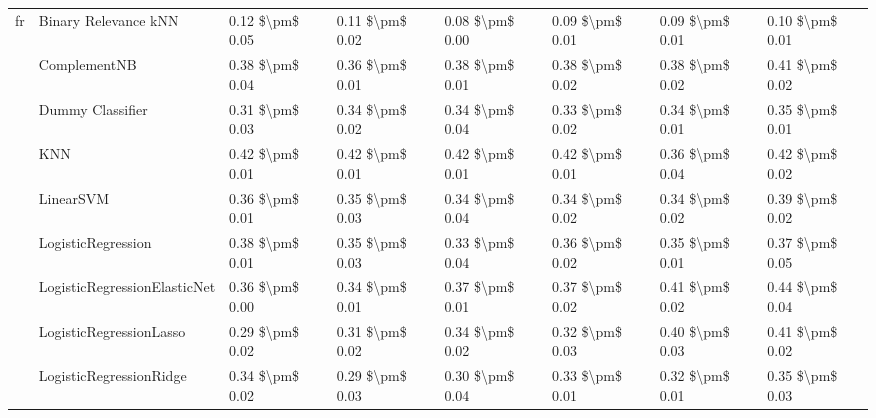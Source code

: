 \begin{tabular}{llllllll}
fr & Binary Relevance kNN &  0.12 \$\textbackslash pm\$ 0.05 &           0.11 \$\textbackslash pm\$ 0.02 &       0.08 \$\textbackslash pm\$ 0.00 &        0.09 \$\textbackslash pm\$ 0.01 &                         0.09 \$\textbackslash pm\$ 0.01 &      0.10 \$\textbackslash pm\$ 0.01 \\
   & ComplementNB &  0.38 \$\textbackslash pm\$ 0.04 &           0.36 \$\textbackslash pm\$ 0.01 &       0.38 \$\textbackslash pm\$ 0.01 &        0.38 \$\textbackslash pm\$ 0.02 &                         0.38 \$\textbackslash pm\$ 0.02 &      0.41 \$\textbackslash pm\$ 0.02 \\
   & Dummy Classifier &  0.31 \$\textbackslash pm\$ 0.03 &           0.34 \$\textbackslash pm\$ 0.02 &       0.34 \$\textbackslash pm\$ 0.04 &        0.33 \$\textbackslash pm\$ 0.02 &                         0.34 \$\textbackslash pm\$ 0.01 &      0.35 \$\textbackslash pm\$ 0.01 \\
   & KNN &  0.42 \$\textbackslash pm\$ 0.01 &           0.42 \$\textbackslash pm\$ 0.01 &       0.42 \$\textbackslash pm\$ 0.01 &        0.42 \$\textbackslash pm\$ 0.01 &                         0.36 \$\textbackslash pm\$ 0.04 &      0.42 \$\textbackslash pm\$ 0.02 \\
   & LinearSVM &  0.36 \$\textbackslash pm\$ 0.01 &           0.35 \$\textbackslash pm\$ 0.03 &       0.34 \$\textbackslash pm\$ 0.04 &        0.34 \$\textbackslash pm\$ 0.02 &                         0.34 \$\textbackslash pm\$ 0.02 &      0.39 \$\textbackslash pm\$ 0.02 \\
   & LogisticRegression &  0.38 \$\textbackslash pm\$ 0.01 &           0.35 \$\textbackslash pm\$ 0.03 &       0.33 \$\textbackslash pm\$ 0.04 &        0.36 \$\textbackslash pm\$ 0.02 &                         0.35 \$\textbackslash pm\$ 0.01 &      0.37 \$\textbackslash pm\$ 0.05 \\
   & LogisticRegressionElasticNet &  0.36 \$\textbackslash pm\$ 0.00 &           0.34 \$\textbackslash pm\$ 0.01 &       0.37 \$\textbackslash pm\$ 0.01 &        0.37 \$\textbackslash pm\$ 0.02 &                         0.41 \$\textbackslash pm\$ 0.02 &      0.44 \$\textbackslash pm\$ 0.04 \\
   & LogisticRegressionLasso &  0.29 \$\textbackslash pm\$ 0.02 &           0.31 \$\textbackslash pm\$ 0.02 &       0.34 \$\textbackslash pm\$ 0.02 &        0.32 \$\textbackslash pm\$ 0.03 &                         0.40 \$\textbackslash pm\$ 0.03 &      0.41 \$\textbackslash pm\$ 0.02 \\
   & LogisticRegressionRidge &  0.34 \$\textbackslash pm\$ 0.02 &           0.29 \$\textbackslash pm\$ 0.03 &       0.30 \$\textbackslash pm\$ 0.04 &        0.33 \$\textbackslash pm\$ 0.01 &                         0.32 \$\textbackslash pm\$ 0.01 &      0.35 \$\textbackslash pm\$ 0.03 \\

\end{tabular}
